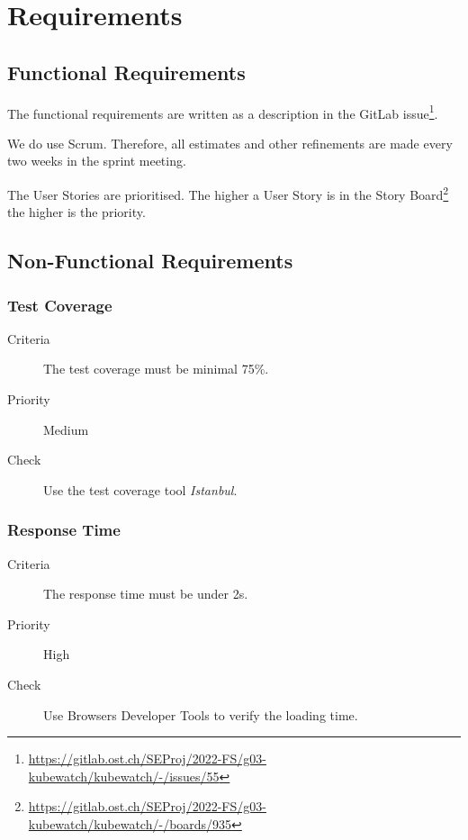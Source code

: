 \chapter{Requirements}



\section{Functional Requirements}
The functional requirements are written as a description in the GitLab issue\footnote{\url{https://gitlab.ost.ch/SEProj/2022-FS/g03-kubewatch/kubewatch/-/issues/55}}.

We do use Scrum.
Therefore, all estimates and other refinements are made every two weeks in the sprint meeting.

The User Stories are prioritised.
The higher a User Story is in the Story Board\footnote{\url{https://gitlab.ost.ch/SEProj/2022-FS/g03-kubewatch/kubewatch/-/boards/935}} the higher is the priority.



\section{Non-Functional Requirements}
\subsection{Test Coverage}
\begin{description}
\item[Criteria] The test coverage must be minimal 75\%.
\item[Priority] Medium
\item[Check] Use the test coverage tool \textsl{Istanbul}.
\end{description}

\subsection{Response Time}
\begin{description}
\item[Criteria] The response time must be under 2s.
\item[Priority] High
\item[Check] Use Browsers Developer Tools to verify the loading time.
\end{description}

